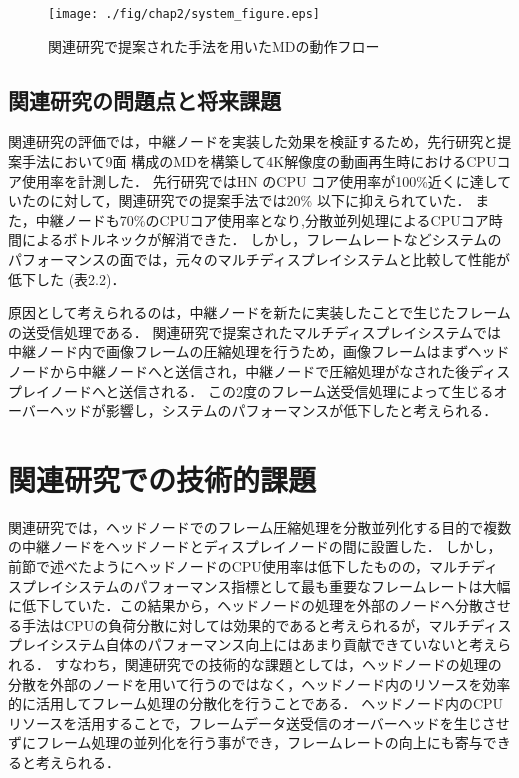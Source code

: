 \begin{figure}[H]
  \hspace*{\fill}
  \texttt{[image: ./fig/chap2/system\_figure.eps]}
  \hspace*{\fill}
  \caption{関連研究で提案された手法を用いたMDの動作フロー}
 \end{figure}

 \subsection*{関連研究の問題点と将来課題}
関連研究の評価では，中継ノードを実装した効果を検証するため，先行研究と提案手法において9面
構成のMDを構築して4K解像度の動画再生時におけるCPUコア使用率を計測した．
先行研究ではHN のCPU コア使用率が100\%近くに達していたのに対して，関連研究での提案手法では20\%
以下に抑えられていた．
また，中継ノードも70\%のCPUコア使用率となり,分散並列処理によるCPUコア時間によるボトルネックが解消できた．
しかし，フレームレートなどシステムのパフォーマンスの面では，元々のマルチディスプレイシステムと比較して性能が低下した (表2.2)．

 \begin{table}[H]
  \centering
  \caption{中継ノード実装によるフレームレートの比較}\label{tab1}
  \end{table}

 原因として考えられるのは，中継ノードを新たに実装したことで生じたフレームの送受信処理である．
 関連研究で提案されたマルチディスプレイシステムでは中継ノード内で画像フレームの圧縮処理を行うため，画像フレームはまずヘッドノードから中継ノードへと送信され，中継ノードで圧縮処理がなされた後ディスプレイノードへと送信される．
 この2度のフレーム送受信処理によって生じるオーバーヘッドが影響し，システムのパフォーマンスが低下したと考えられる．

 \section{関連研究での技術的課題}
関連研究では，ヘッドノードでのフレーム圧縮処理を分散並列化する目的で複数の中継ノードをヘッドノードとディスプレイノードの間に設置した．
しかし，前節で述べたようにヘッドノードのCPU使用率は低下したものの，マルチディスプレイシステムのパフォーマンス指標として最も重要なフレームレートは大幅に低下していた．この結果から，ヘッドノードの処理を外部のノードへ分散させる手法はCPUの負荷分散に対しては効果的であると考えられるが，マルチディスプレイシステム自体のパフォーマンス向上にはあまり貢献できていないと考えられる．
すなわち，関連研究での技術的な課題としては，ヘッドノードの処理の分散を外部のノードを用いて行うのではなく，ヘッドノード内のリソースを効率的に活用してフレーム処理の分散化を行うことである．
ヘッドノード内のCPUリソースを活用することで，フレームデータ送受信のオーバーヘッドを生じさせずにフレーム処理の並列化を行う事ができ，フレームレートの向上にも寄与できると考えられる．

